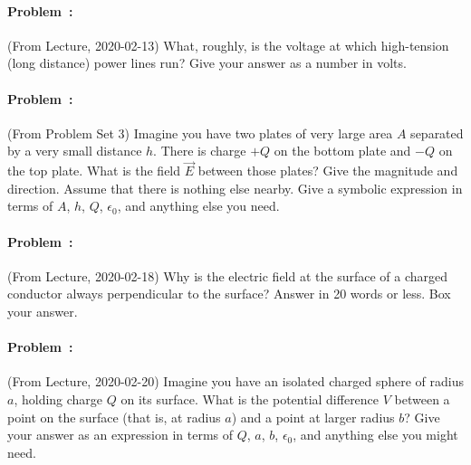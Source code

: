 \documentclass[12pt]{article}
\begin{document}
\paragraph{Problem~\theproblem:}%
(From Lecture, 2020-02-13)
What, roughly, is the voltage at which high-tension (long distance) power lines run?
Give your answer as a number in volts.

\vfill
\paragraph{Problem~\theproblem:}%
(From Problem Set 3)
Imagine you have two plates of very large area $A$ separated by a very small distance $h$.
There is charge $+Q$ on the bottom plate and $-Q$ on the top plate.
What is the field $\vec{E}$ between those plates? Give the magnitude and direction.
Assume that there is nothing else nearby.
Give a symbolic expression in terms of $A$, $h$, $Q$, $\epsilon_0$, and anything else you need.

\vfill
\paragraph{Problem~\theproblem:}%
(From Lecture, 2020-02-18)
Why is the electric field at the surface of a charged conductor always
perpendicular to the surface? Answer in 20 words or less. Box your answer.

\vfill
\paragraph{Problem~\theproblem:}%
(From Lecture, 2020-02-20)
Imagine you have an isolated charged sphere of radius $a$, holding
charge $Q$ on its surface.
What is the potential difference $V$ between a point on the surface (that
is, at radius $a$) and a point at larger radius $b$?
Give your answer as an expression in terms of $Q$, $a$, $b$, $\epsilon_0$, and
anything else you might need.

\vfill ~
\end{document}
